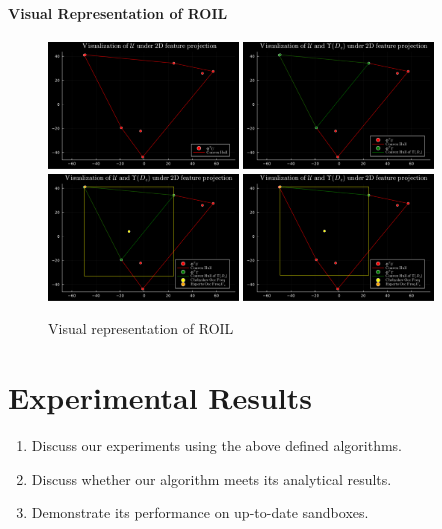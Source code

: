 \documentclass[11pt]{article}
\begin{document}
\paragraph{Visual Representation of ROIL}

\begin{figure}[htbp]
	\centering
	\includegraphics[width=0.45\textwidth]{../notebooks/plots/visual_U.pdf}
	\includegraphics[width=0.45\textwidth]{../notebooks/plots/visual_U_and_Upsilon.pdf}
	\includegraphics[width=0.45\textwidth]{../notebooks/plots/visual_solve_cheb.pdf}
	\includegraphics[width=0.45\textwidth]{../notebooks/plots/visual_solve_cheb_outside_upsilon.pdf}
	\caption{Visual representation of ROIL}
	\label{fig:visual_representation_of_ROIL}
\end{figure}

\section{Experimental Results}
\begin{enumerate}
	\item Discuss our experiments using the above defined algorithms.
	\item Discuss whether our algorithm meets its analytical results.
	\item Demonstrate its performance on up-to-date sandboxes.
\end{enumerate}
\end{document}
